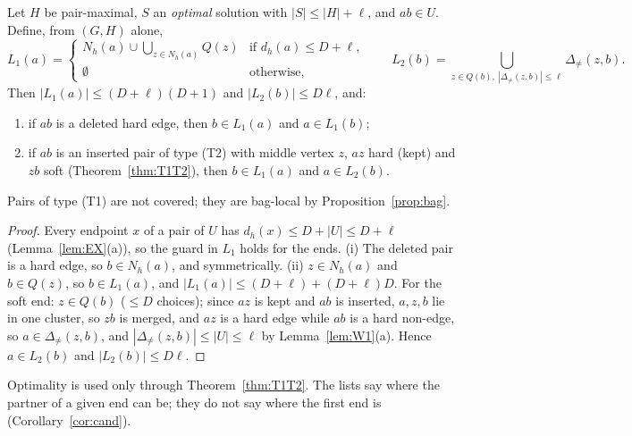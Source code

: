 \begin{proposition}\label{prop:candlist}
Let $H$ be pair-maximal, $S$ an \emph{optimal} solution with $|S|\le|H|+\ell$, and $ab\in U$. Define, from $(G,H)$ alone,
\[
L_1(a)=\begin{cases}N_h(a)\cup\bigcup_{z\in N_h(a)}Q(z)&\text{if }d_h(a)\le D+\ell,\\ \emptyset&\text{otherwise,}\end{cases}\qquad
L_2(b)=\bigcup_{z\in Q(b),\ |\Delta_{\neq}(z,b)|\le\ell}\Delta_{\neq}(z,b).
\]
Then $|L_1(a)|\le(D+\ell)(D+1)$ and $|L_2(b)|\le D\ell$, and:
\begin{enumerate}
\item[(i)] if $ab$ is a deleted hard edge, then $b\in L_1(a)$ and $a\in L_1(b)$;
\item[(ii)] if $ab$ is an inserted pair of type (T2) with middle vertex $z$, $az$ hard (kept) and $zb$ soft (Theorem~\ref{thm:T1T2}), then $b\in L_1(a)$ and $a\in L_2(b)$.
\end{enumerate}
Pairs of type (T1) are not covered; they are bag-local by Proposition~\ref{prop:bag}.
\end{proposition}
\begin{proof}
Every endpoint $x$ of a pair of $U$ has $d_h(x)\le D+|U|\le D+\ell$ (Lemma~\ref{lem:EX}(a)), so the guard in $L_1$ holds for the ends. (i) The deleted pair is a hard edge, so $b\in N_h(a)$, and symmetrically. (ii) $z\in N_h(a)$ and $b\in Q(z)$, so $b\in L_1(a)$, and $|L_1(a)|\le(D+\ell)+(D+\ell)D$. For the soft end: $z\in Q(b)$ ($\le D$ choices); since $az$ is kept and $ab$ is inserted, $a,z,b$ lie in one cluster, so $zb$ is merged, and $az$ is a hard edge while $ab$ is a hard non-edge, so $a\in\Delta_{\neq}(z,b)$, and $|\Delta_{\neq}(z,b)|\le|U|\le\ell$ by Lemma~\ref{lem:W1}(a). Hence $a\in L_2(b)$ and $|L_2(b)|\le D\ell$.
\end{proof}
Optimality is used only through Theorem~\ref{thm:T1T2}. The lists say where the partner of a given end can be; they do not say where the first end is (Corollary~\ref{cor:cand}).

